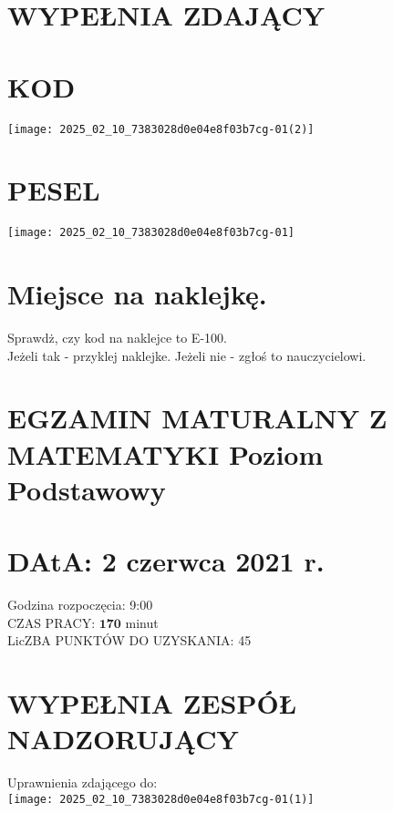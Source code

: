 \documentclass[10pt]{article}
\begin{document}
\section*{WYPEŁNIA ZDAJĄCY}
\section*{KOD}
\begin{center}
\texttt{[image: 2025\_02\_10\_7383028d0e04e8f03b7cg-01(2)]}
\end{center}

\section*{PESEL}
\begin{center}
\texttt{[image: 2025\_02\_10\_7383028d0e04e8f03b7cg-01]}
\end{center}

\section*{Miejsce na naklejkę.}
Sprawdż, czy kod na naklejce to E-100.\\
Jeżeli tak - przyklej naklejke. Jeżeli nie - zgłoś to nauczycielowi.

\section*{EGZAMIN MATURALNY Z MATEMATYKI Poziom Podstawowy}
\section*{DAtA: 2 czerwca 2021 r.}
Godzina rozpoczęcia: 9:00\\
CZAS PRACY: \(\mathbf{1 7 0}\) minut\\
LicZBA PUNKTÓW DO UZYSKANIA: 45

\section*{WYPEŁNIA ZESPÓŁ NADZORUJĄCY}
Uprawnienia zdającego do:\\
\texttt{[image: 2025\_02\_10\_7383028d0e04e8f03b7cg-01(1)]}
\end{document}
